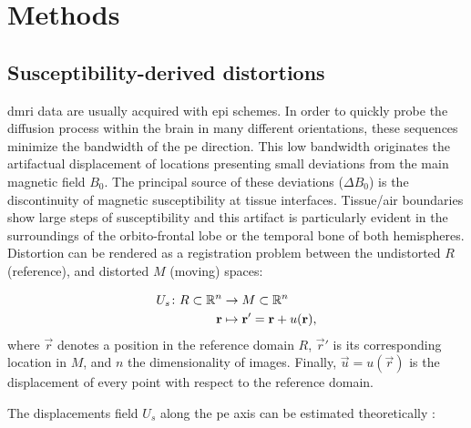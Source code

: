 \section{Methods}
\label{sec:methods}
%

\subsection{Susceptibility-derived distortions}
\label{sec:distortions}
\Gls*{dmri} data are usually acquired with \gls*{epi} schemes.
In order to quickly probe the diffusion process within the brain in many different orientations,
  these sequences minimize the bandwidth of the \gls*{pe} direction.
This low bandwidth originates the artifactual displacement of locations presenting small deviations
  from the main magnetic field $B_0$.
The principal source of these deviations ($\Delta B_0$) is the discontinuity of magnetic
  susceptibility at tissue interfaces.
Tissue/air boundaries show large steps of susceptibility and this artifact is
  particularly evident in the surroundings of the orbito-frontal lobe or the temporal
  bone of both hemispheres.
Distortion can be rendered as a registration problem between the undistorted $R$ (reference), 
  and distorted $M$ (moving) spaces:

  \begin{align}
  U_s\colon R \subset \mathbb{R}^n &\to M \subset \mathbb{R}^n \notag\\
  \vec{r} &\mapsto \vec{r}' =\vec{r}+u(\vec{r}),
  \label{eq:transform}
  \end{align}
%
  where $\vec{r}$ denotes a position in the reference domain $R$, $\vec{r}'$ is
  its corresponding location in $M$, and $n$ the dimensionality of images.
Finally, $\vec{u} = u(\vec{r})$ is the displacement of every point with respect
  to the reference domain.

The displacements field $U_s$ along the \gls*{pe} axis can be estimated theoretically
  \citep{jezzard_correction_1995}:

